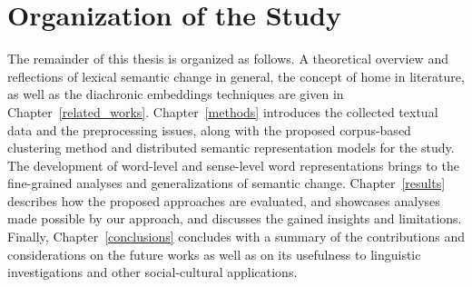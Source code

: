 \section{Organization of the Study}
The remainder of this thesis is organized as follows. A theoretical overview and reflections of lexical semantic change in general, the concept of home in literature, as well as the diachronic embeddings techniques are given in Chapter~\ref{related_works}. Chapter~\ref{methods} introduces the collected textual data and the preprocessing issues, along with the proposed corpus-based clustering method and distributed semantic representation models for the study. The development of word-level and sense-level word representations brings to the fine-grained analyses and generalizations of semantic change. Chapter~\ref{results} describes how the proposed approaches are evaluated, and showcases analyses made possible by our approach, and discusses the gained insights and limitations. Finally, Chapter~\ref{conclusions} concludes with a summary of the contributions and considerations on the future works as well as on its usefulness to linguistic investigations and other social-cultural applications.

